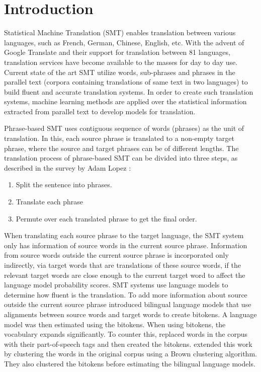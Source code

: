 %
%

\chapter{Introduction}

Statistical Machine Translation (SMT) enables translation between various languages, such as French, German, Chinese, English, etc. With the advent of Google Translate and their support for translation between 81 languages, translation services have become available to the masses for day to day use. Current state of the art SMT utilize words, sub-phrases and phrases in the parallel text (corpora containing translations of same text in two languages) to build fluent and accurate translation systems. In order to create such translation systems, machine learning methods are applied over the statistical information extracted from parallel text to develop models for translation.

Phrase-based SMT \cite{Koehn2003} uses contiguous sequence of words (phrases) as the unit of translation. In this, each source phrase is translated to a non-empty target phrase, where the source and target phrases can be of different lengths. The translation process of phrase-based SMT can be divided into three steps, as described in the survey by Adam Lopez \cite{Lopez2008}:
\begin{enumerate}
\item Split the sentence into phrases.
\item Translate each phrase
\item Permute over each translated phrase to get the final order.
\end{enumerate}

When translating each source phrase to the target language, the SMT system only has information of source words in the current source phrase. Information from source words outside the current source phrase is incorporated only indirectly, via target words that are translations of these source words, if the relevant target words are close enough to the current target word to affect the language model probability scores. SMT systems use language models to determine how fluent is the translation. To add more information about source outside the current source phrase \cite{Niehues2011} introduced bilingual language models that use alignments between source words and target words to create bitokens. A language model was then estimated using the bitokens. When using bitokens, the vocabulary expands significantly. To counter this, \cite{Niehues2011} replaced words in the corpus with their part-of-speech tags and then created the bitokens. \cite{Stewart2014} extended this work by clustering the words in the original corpus using a Brown clustering algorithm. They also clustered the bitokens before estimating the bilingual language models. 

